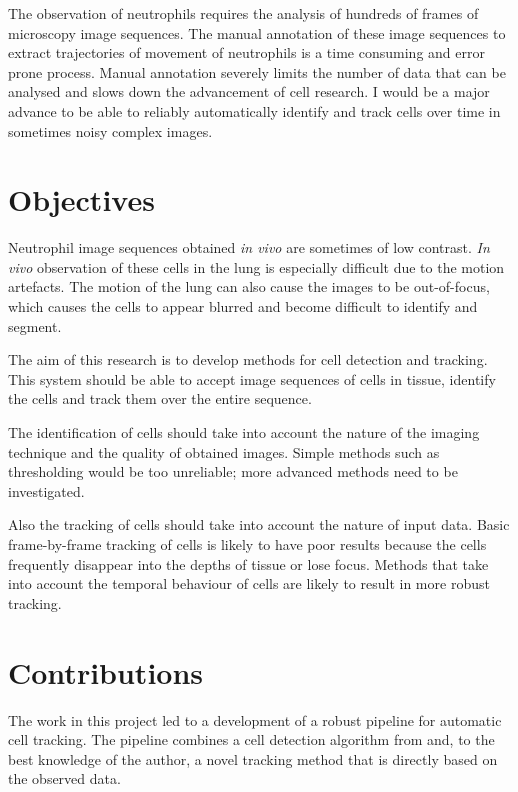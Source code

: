 		The observation of neutrophils requires the analysis of hundreds of frames of microscopy image sequences. The manual annotation of these image sequences to extract trajectories of movement of neutrophils is a time consuming and error prone process. Manual annotation severely limits the number of data that can be analysed and slows down the advancement of cell research. I would be a major advance to be able to reliably automatically identify and track cells over time in sometimes noisy complex images.
		
	\section{Objectives \statusfirstdraft}
		
		Neutrophil image sequences obtained \textit{in vivo} are sometimes of low contrast. \textit{In vivo} observation of these cells in the lung is especially difficult due to the motion artefacts. The motion of the lung can also cause the images to be out-of-focus, which causes the cells to appear blurred and become difficult to identify and segment.
		
		The aim of this research is to develop methods for cell detection and tracking. This system should be able to accept image sequences of cells in tissue, identify the cells and track them over the entire sequence.
		
		The identification of cells should take into account the nature of the imaging technique and the quality of obtained images. Simple methods such as thresholding would be too unreliable; more advanced methods need to be investigated.
		
		Also the tracking of cells should take into account the nature of input data. Basic frame-by-frame tracking of cells is likely to have poor results because the cells frequently disappear into the depths of tissue or lose focus. Methods that take into account the temporal behaviour of cells are likely to result in more robust tracking.
		
	\section{Contributions \statusfirstdraft}
		
		The work in this project led to a development of a robust pipeline for automatic cell tracking. The pipeline combines a cell detection algorithm from \cite{arteta12} and, to the best knowledge of the author, a novel tracking method that is directly based on the observed data. 
		
